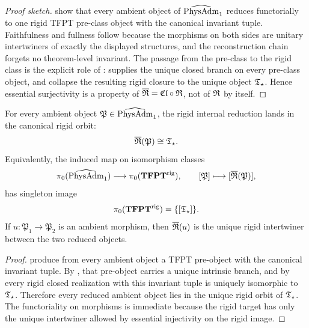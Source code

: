 \begin{proof}[Proof sketch]
show that every ambient object of $\widehat{\mathrm{PhysAdm}}_1$ reduces functorially to one rigid TFPT
pre-class object with the canonical invariant tuple. Faithfulness and fullness follow because the
morphisms on both sides are unitary intertwiners of exactly the displayed structures, and the
reconstruction chain forgets no theorem-level invariant. The passage from the pre-class to the
rigid class is the explicit role of : 
supplies the unique closed branch on every pre-class object, and
 collapse the resulting rigid
closure to the unique object $\mathfrak T_{\star}$. Hence essential surjectivity is a property of
$\overline{\mathfrak R}=\mathfrak{Cl}\circ\mathfrak R$, not of $\mathfrak R$ by itself.
\end{proof}

\fi

\begin{theorem}
\label{thm:universality-tfpt}
For every ambient object $\mathfrak P\in\widehat{\mathrm{PhysAdm}}_1$, the rigid internal reduction lands in the
canonical rigid orbit:
\[
\overline{\mathfrak R}(\mathfrak P)\cong \mathfrak T_{\star}.
\]
Equivalently, the induced map on isomorphism classes
\[
\pi_0(\widehat{\mathrm{PhysAdm}}_1)\longrightarrow \pi_0(\mathbf{TFPT}^{\mathrm{rig}}),
\qquad
[\mathfrak P]\longmapsto [\overline{\mathfrak R}(\mathfrak P)],
\]
has singleton image
\[
\pi_0(\mathbf{TFPT}^{\mathrm{rig}})=\{[\mathfrak T_{\star}]\}.
\]
If $u:\mathfrak P_1\to\mathfrak P_2$ is an ambient morphism, then $\overline{\mathfrak R}(u)$ is the unique rigid
intertwiner between the two reduced objects.
\end{theorem}

\begin{proof}
produce from every ambient object a TFPT pre-object with the canonical invariant tuple. By
, that pre-object carries a unique intrinsic branch, and by
 every rigid closed realization
with this invariant tuple is uniquely isomorphic to $\mathfrak T_{\star}$. Therefore every reduced ambient
object lies in the unique rigid orbit of $\mathfrak T_{\star}$. The functoriality on morphisms is immediate
because the rigid target has only the unique intertwiner allowed by essential injectivity on the
rigid image.
\end{proof}

